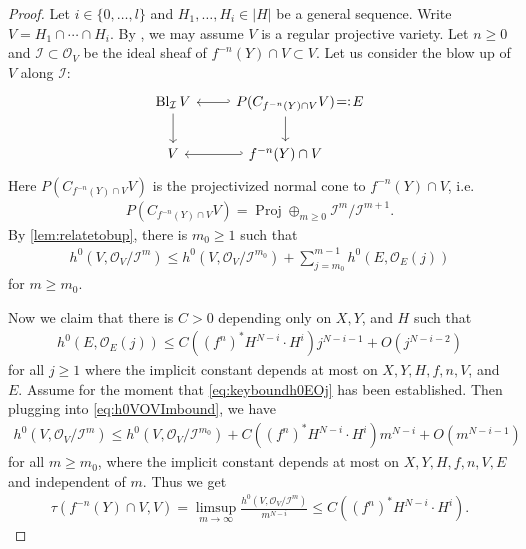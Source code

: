 \documentclass[12pt]{amsart}
\theoremstyle{plain}
\theoremstyle{definition}
\numberwithin{equation}{section}
\def\O{{ \mathcal{O}}}
\def\I{{ \mathcal{I}}}
\DeclareMathOperator{\Proj}{Proj}
\DeclareMathOperator{\Bl}{Bl}
\begin{document}
\begin{proof}
Let $i \in \{0, \dots, l\}$ and $H_{1},\dots, H_{i} \in |H|$ be a general sequence.
Write $V = H_{1} \cap \cdots \cap H_{i}$.
By \cite[(3.4.10), Corollary 3.4.14]{joinintersec}, we may assume $V$ is a regular projective variety.
Let  $n \geq 0$ and $\I \subset \O_{V}$ be the ideal sheaf of $f^{-n}(Y) \cap V \subset V$.
Let us consider the blow up of $V$ along $\I$:
\begin{equation}
\begin{tikzcd}
\Bl_{\I}V \arrow[d] \arrow[r,hookleftarrow] & P(C_{f^{-n}(Y)\cap V}V) \arrow[d] \arrow[r,phantom,"=:"] &[-2em]  E\\
V \arrow[r,hookleftarrow]  & f^{-n}(Y)\cap V  &
\end{tikzcd}
\end{equation}
Here $ P(C_{f^{-n}(Y)\cap V}V)$ is the projectivized normal cone to $f^{-n}(Y)\cap V$, i.e.
\begin{align}
P(C_{f^{-n}(Y)\cap V}V) = \Proj \oplus_{m \geq 0} \I^{m}/\I^{m+1}.
\end{align}
By \cref{lem:relatetobup}, there is $m_{0} \geq 1$ such that
\begin{align}
h^{0}(V, \O_{V} / \I^{m}) \leq h^{0}(V, \O_{V}/\I^{m_{0}}) + \sum_{j = m_{0}}^{m-1} h^{0}(E, \O_{E}(j)) \label{eq:h0VOVImbound}
\end{align}
for $m \geq m_{0}$.

Now we claim that there is $C > 0$ depending only on $X,Y$, and $H$ such that
\begin{align}
h^{0}(E, \O_{E}(j)) \leq C ((f^{n})^{*}H^{N-i} \cdot H^{i}) j^{N-i-1} + O(j^{N-i-2}) \label{eq:keyboundh0EOj}
\end{align}
for all $j \geq 1$ where the implicit constant depends at most on $X, Y, H, f, n, V$, and $E$.
Assume for the moment that \cref{eq:keyboundh0EOj} has been established.
Then plugging into \cref{eq:h0VOVImbound}, we have
\begin{align}
h^{0}(V, \O_{V}/\I^{m}) \leq h^{0}(V, \O_{V}/\I^{m_{0}}) + C ((f^{n})^{*}H^{N-i} \cdot H^{i}) m^{N-i} + O(m^{N-i-1})
\end{align}
for all $m \geq m_{0}$, where the implicit constant depends at most on $X, Y, H, f, n, V, E$ and independent of $m$.
Thus we get
\begin{align}
\tau(f^{-n}(Y) \cap V, V) = \limsup_{m \to \infty} \frac{h^{0}(V, \O_{V}/\I^{m})}{m^{N-i}} \leq C ((f^{n})^{*}H^{N-i} \cdot H^{i}).
\end{align}


\end{proof}
\end{document}
